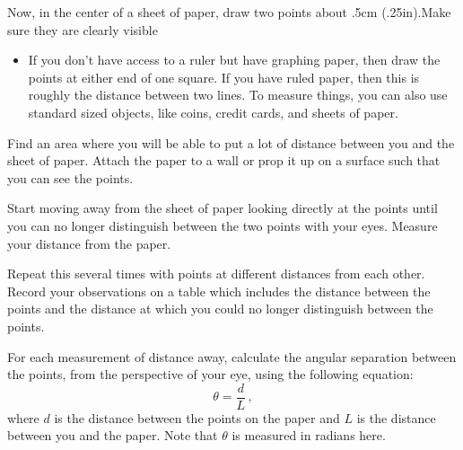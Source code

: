 \begin{steps}
	\item Now, in the center of a sheet of paper, draw two points about .5cm (.25in).Make sure they are clearly visible 

\begin{itemize}
	\item If you don't have access to a ruler but have graphing paper, then draw the points at either end of one square. If you have ruled paper, then this is roughly the distance between two lines. To measure things, you can also use standard sized objects, like coins, credit cards, and sheets of paper.
\end{itemize}

	\item Find an area where you will be able to put a lot of distance between you and the sheet of paper. Attach the paper to a wall or prop it up on a surface such that you can see the points. 
	
	

	\item Start moving away from the sheet of paper looking directly at the points until you can no longer distinguish between the two points with your eyes. Measure your distance from the paper.
	
	\item Repeat this several times with points at different distances from each other. Record your observations on a table which includes the distance between the points and the distance at which you could no longer distinguish between the points.
	
	\item For each measurement of distance away, calculate the angular separation between the points, from the perspective of your eye, using the following equation:
	\begin{equation}
	 \theta = \frac{d}{L} \,,
	\end{equation}
	where $d$ is the distance between the points on the paper and $L$ is the distance between you and the paper. Note that $\theta$ is measured in radians here.
	

\end{steps}
